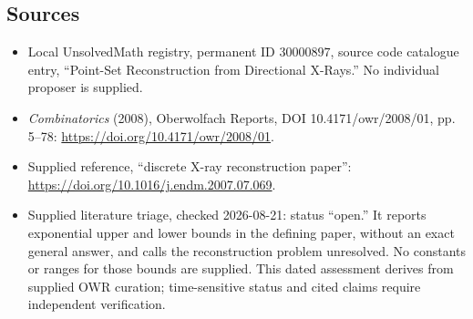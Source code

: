 \documentclass[11pt]{article}
\begin{document}
\subsection{Sources}
\begin{itemize}
\item Local UnsolvedMath registry, permanent ID \(30000897\), source code catalogue entry, ``Point-Set Reconstruction from Directional X-Rays.'' No individual proposer is supplied.
\item \emph{Combinatorics} (2008), Oberwolfach Reports, DOI 10.4171/owr/2008/01, pp. 5--78: \url{https://doi.org/10.4171/owr/2008/01}.
\item Supplied reference, ``discrete X-ray reconstruction paper'': \url{https://doi.org/10.1016/j.endm.2007.07.069}.
\item Supplied literature triage, checked 2026-08-21: status ``open.'' It reports exponential upper and lower bounds in the defining paper, without an exact general answer, and calls the reconstruction problem unresolved. No constants or ranges for those bounds are supplied. This dated assessment derives from supplied OWR curation; time-sensitive status and cited claims require independent verification.
\end{itemize}
\end{document}
